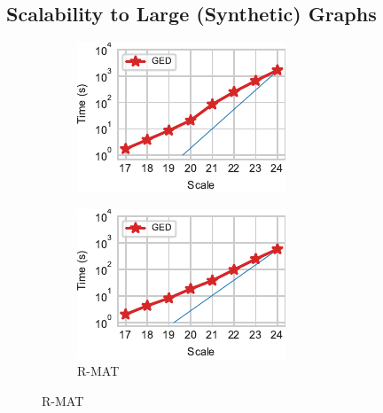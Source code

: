 \subsection{Scalability to Large (Synthetic) Graphs}
%
\begin{figure}[tb]
\centering
\begin{subfigure}[t]{.24\textwidth}
\includegraphics[width=\textwidth]{./sources/plots/ged-walk/ER_scalability.pdf}
\caption{\erdosr}
\label{fig:ged-walk:ER-scalability}
\end{subfigure}\hfill
\begin{subfigure}[t]{.24\textwidth}
\includegraphics[width=\textwidth]{./sources/plots/ged-walk/RMAT_scalability.pdf}
\caption{R-MAT}
\label{fig:ged-walk:RMAT-scalability}
\end{subfigure}\hfill

\end{figure}
